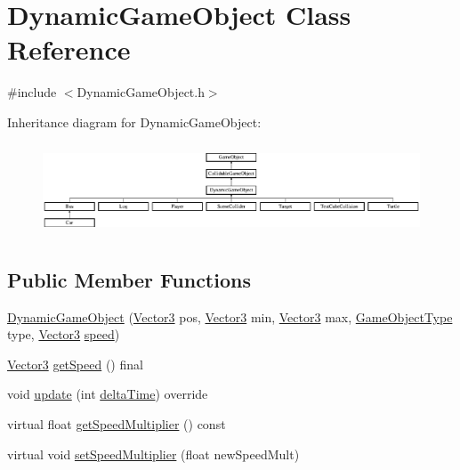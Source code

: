 \hypertarget{class_dynamic_game_object}{}\section{Dynamic\+Game\+Object Class Reference}
\label{class_dynamic_game_object}


{\ttfamily \#include $<$Dynamic\+Game\+Object.\+h$>$}

Inheritance diagram for Dynamic\+Game\+Object\+:\begin{figure}[H]
\begin{center}
\leavevmode
\includegraphics[height=2.758621cm]{class_dynamic_game_object}
\end{center}
\end{figure}
\subsection*{Public Member Functions}
\begin{DoxyCompactItemize}
\item 
\hyperlink{class_dynamic_game_object_ab7d7036c283760e0035d39713a82016a}{Dynamic\+Game\+Object} (\hyperlink{class_vector3}{Vector3} pos, \hyperlink{class_vector3}{Vector3} min, \hyperlink{class_vector3}{Vector3} max, \hyperlink{_game_object_8h_a57678b60d65afb213d04a6b090c64a08}{Game\+Object\+Type} type, \hyperlink{class_vector3}{Vector3} \hyperlink{class_dynamic_game_object_a54cb8a3a5fe8314cd5751f223b2b49ae}{speed})
\item 
\hyperlink{class_vector3}{Vector3} \hyperlink{class_dynamic_game_object_a22d2cededc50901db950ac23b46e4d42}{get\+Speed} () final
\item 
void \hyperlink{class_dynamic_game_object_aaa505b57d131bbbce44d500ec2ca0e83}{update} (int \hyperlink{_game_manager_8h_afea6a95c7a1c119b7106a4c735eb259d}{delta\+Time}) override
\item 
virtual float \hyperlink{class_dynamic_game_object_a677f4bdcd11800fee831a13234382619}{get\+Speed\+Multiplier} () const
\item 
virtual void \hyperlink{class_dynamic_game_object_a7bf254357b0d2491044d175afdc36ca4}{set\+Speed\+Multiplier} (float new\+Speed\+Mult)
\end{DoxyCompactItemize}

